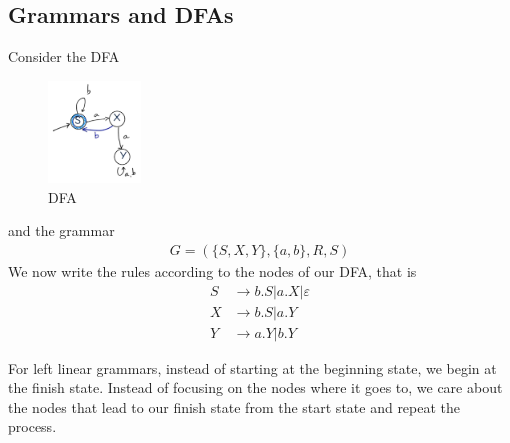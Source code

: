 \documentclass[a4paper]{article}
\theoremstyle{plain}
\theoremstyle{definition}
\newtheorem{defn}{Definition}[section]
\newtheorem{exmp}{Example}[section]
\theoremstyle{remark}
\begin{document}
\subsection{Grammars and DFAs}
\begin{tcolorbox}[colback=black!3!white,colframe=black!60!white,title=\begin{exmp}DFA to right-linear Grammar \label{DFA to right-linear Grammar}\end{exmp}]
Consider the DFA 
\begin{figure}[H]
	\centering
	\includegraphics[width=0.22\textwidth]{fourteen.png}
	\caption{DFA}
	\label{fig:DFA}
\end{figure}
and the grammar
\begin{align}
	G = (\{S,X,Y\},\{a,b\},R,S)
\end{align}
We now write the rules according to the nodes of our DFA, that is
\begin{align}
	S &\to b.S | a.X | \varepsilon \\
	X &\to b.S | a.Y \\
	Y &\to a.Y | b.Y
\end{align}
\end{tcolorbox}
\begin{tcolorbox}[colback=black!3!white,colframe=black!60!white,title=\begin{defn}DFA to left-linera Grammar \label{DFA to left-linera Grammar}\end{defn}]
For left linear grammars, instead of starting at the beginning state, we begin at the finish state. Instead of focusing on the nodes where it goes to, we care about the nodes that lead to our finish state from the start state and repeat the process.
\end{tcolorbox}
\end{document}
